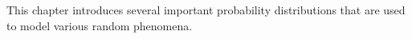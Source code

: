 This chapter introduces several important probability distributions that are used to model various random phenomena.
